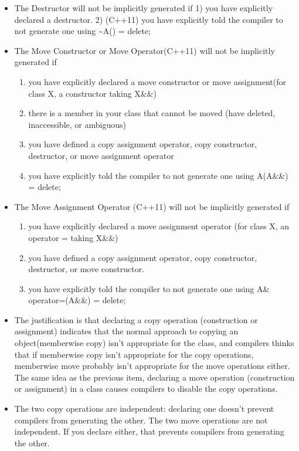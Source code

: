\documentclass[a4paper,11pt,twoside]{book}
\begin{document}
\begin{itemize}
	
	\item The Destructor will not be implicitly generated if 1) you have explicitly declared a destructor. 2) (C++11) you have explicitly told the compiler to not generate one using \textasciitilde A() = delete;

	
	\item The Move Constructor or Move Operator(C++11) will not be implicitly generated if
		\begin{enumerate}
		\item you have explicitly declared a move constructor or move assignment(for class X, a constructor taking X\&\&)
		\item there is a member in your class that cannot be moved (have deleted, inaccessible, or ambiguous)
		\item you have defined a copy assignment operator, copy constructor, destructor, or move assignment operator
		\item you have explicitly told the compiler to not generate one using A(A\&\&) = delete;
		\end{enumerate}
	
	
	\item The Move Assignment Operator (C++11) will not be implicitly generated if
		\begin{enumerate}
		\item you have explicitly declared a move assignment operator (for class X, an operator = taking X\&\&)
		
		\item you have defined a copy assignment operator, copy constructor, destructor, or move constructor.
		
		\item you have explicitly told the compiler to not generate one using A\& operator=(A\&\&) = delete;
		\end{enumerate}
	
	\item  The justification is that declaring a copy operation (construction or assignment) indicates that the normal approach to copying an object(memberwise copy) isn't appropriate for the class, and compilers thinks that if memberwise copy isn't appropriate for the copy operations, memberwise move probably isn't appropriate for the move operations either. The same idea as the previous item, declaring a move operation (construction or assignment) in a class causes compilers to disable the copy operations.
	
	\item The two copy operations are independent: declaring one doesn't prevent compilers from generating the other. The two move operations are not independent. If you declare either, that prevents compilers from generating the other.
	

\end{itemize}
\end{document}
